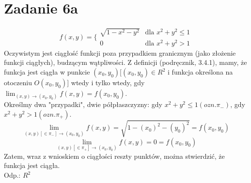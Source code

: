 \documentclass{article}
\begin{document}
\section*{Zadanie 6a}
$$f(x,y)=\bigg\{\begin{array}{rl}
\sqrt{1-x^2-y^2} & \textrm{dla $x^2+y^2 \leq 1$} \\ 0 & \textrm{dla $x^2 + y^2 > 1$} \end{array}$$
Oczywistym jest ciągłość funkcji poza przypadkiem granicznym (jako złożenie funkcji ciągłych), budzącym wątpliwości. Z definicji (podręcznik, 3.4.1), mamy, że funkcja jest ciągła w punkcie $(x_0,y_0)$[$(x_0,y_0) \in R^2$ i funkcja określona na otoczeniu $O(x_0,y_0)$] wtedy i tylko wtedy, gdy $\lim_{(x,y)\to (x_0,y_0)} f(x,y) = f(x_0,y_0)$. \\
Określmy dwa "przypadki", dwie półpłaszczyzny: gdy $x^2+y^2 \leq 1 (ozn. \pi_{-})$, gdy $x^2+y^2 > 1 ( ozn. \pi_{+})$.
$$\lim_{(x,y)[\in \pi_{-}]\to (x_0,y_0)} f(x,y) = \sqrt{1-(x_0)^2 - (y_0)^2} = f(x_0,y_0)$$
$$\lim_{(x,y)[\in \pi_{+}]\to (x_0,y_0)} f(x,y) = 0 = f(x_0,y_0)$$
Zatem, wraz z wnioskiem o ciągłości reszty punktów, można stwierdzić, że funkcja jest ciągła. \\ 
Odp.: $R^2$
\end{document}
